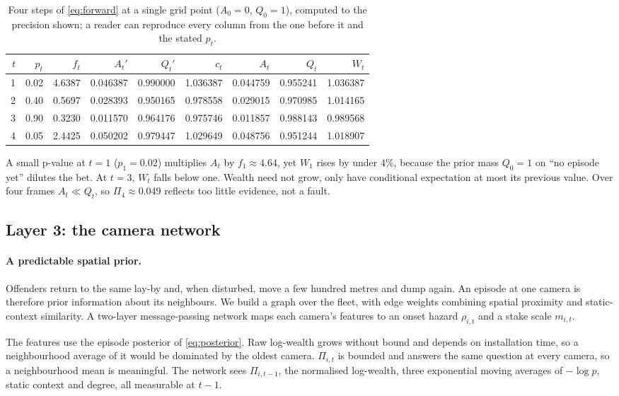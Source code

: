\begin{table}[t]
\centering
\caption{Four steps of \cref{eq:forward} at a single grid point
($A_0 = 0$, $Q_0 = 1$), computed to the precision shown; a reader can
reproduce every column from the one before it and the stated $p_t$.}
\label{tab:worked-recursion}
\begin{tabular}{rrrrrrrrr}
\toprule
$t$ & $p_t$ & $f_t$ & $A_t'$ & $Q_t'$ & $c_t$ & $A_t$ & $Q_t$ & $W_t$ \\
\midrule
1 & 0.02 & 4.6387 & 0.046387 & 0.990000 & 1.036387 & 0.044759 & 0.955241 & 1.036387 \\
2 & 0.40 & 0.5697 & 0.028393 & 0.950165 & 0.978558 & 0.029015 & 0.970985 & 1.014165 \\
3 & 0.90 & 0.3230 & 0.011570 & 0.964176 & 0.975746 & 0.011857 & 0.988143 & 0.989568 \\
4 & 0.05 & 2.4425 & 0.050202 & 0.979447 & 1.029649 & 0.048756 & 0.951244 & 1.018907 \\
\bottomrule
\end{tabular}
\end{table}

A small p-value at $t=1$ ($p_1 = 0.02$) multiplies $A_t$ by $f_1 \approx 4.64$, yet $W_1$ rises by under $4\%$, because the prior mass $Q_0 = 1$ on ``no episode yet'' dilutes the bet. At $t=3$, $W_t$ falls below one. Wealth need not grow, only have conditional expectation at most its previous value. Over four frames $A_t \ll Q_t$, so $\Pi_4 \approx 0.049$ reflects too little evidence, not a fault.

\subsection{Layer 3: the camera network}
\label{sec:layer3}

\paragraph{A predictable spatial prior.}
Offenders return to the same lay-by and, when disturbed, move a few hundred metres and dump again. An episode at one camera is therefore prior information about its neighbours. We build a graph over the fleet, with edge weights combining spatial proximity and static-context similarity. A two-layer message-passing network maps each camera's features to an onset hazard $\rho_{i,t}$ and a stake scale $m_{i,t}$.

The features use the episode posterior of \cref{eq:posterior}. Raw log-wealth grows without bound and depends on installation time, so a neighbourhood average of it would be dominated by the oldest camera. $\Pi_{i,t}$ is bounded and answers the same question at every camera, so a neighbourhood mean is meaningful. The network sees $\Pi_{i,t-1}$, the normalised log-wealth, three exponential moving averages of $-\log p$, static context and degree, all measurable at $t-1$.

